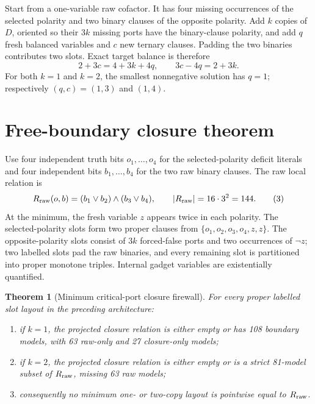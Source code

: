\documentclass[11pt]{article}
\newtheorem{theorem}{Theorem}
\begin{document}
Start from a one-variable raw cofactor.  It has four missing occurrences of
the selected polarity and two binary clauses of the opposite polarity.  Add
$k$ copies of $D$, oriented so their $3k$ missing ports have the binary-clause
polarity, and add $q$ fresh balanced variables and $c$ new ternary clauses.
Padding the two binaries contributes two slots.  Exact target balance is
therefore
\[
 2+3c=4+3k+4q,
 \qquad \boxed{3c-4q=2+3k}.                         \tag{2}
\]
For both $k=1$ and $k=2$, the smallest nonnegative solution has $q=1$;
respectively $(q,c)=(1,3)$ and $(1,4)$.

\section{Free-boundary closure theorem}

Use four independent truth bits $o_1,\ldots,o_4$ for the selected-polarity
deficit literals and four independent bits $b_1,\ldots,b_4$ for the two raw
binary clauses.  The raw local relation is
\[
 R_{\rm raw}(o,b)=(b_1\lor b_2)\land(b_3\lor b_4),
\qquad |R_{\rm raw}|=16\cdot 3^2=144.              \tag{3}
\]
At the minimum, the fresh variable $z$ appears twice in each polarity.  The
selected-polarity slots form two proper clauses from
$\{o_1,o_2,o_3,o_4,z,z\}$.  The opposite-polarity slots consist of $3k$
forced-false ports and two occurrences of $\neg z$; two labelled slots pad the
raw binaries, and every remaining slot is partitioned into proper monotone
triples.  Internal gadget variables are existentially quantified.

\begin{theorem}[Minimum critical-port closure firewall]
For every proper labelled slot layout in the preceding architecture:
\begin{enumerate}
\item if $k=1$, the projected closure relation is either empty or has 108
boundary models, with 63 raw-only and 27 closure-only models;
\item if $k=2$, the projected closure relation is either empty or is a strict
81-model subset of $R_{\rm raw}$, missing 63 raw models;
\item consequently no minimum one- or two-copy layout is pointwise equal to
$R_{\rm raw}$.
\end{enumerate}
\end{theorem}
\end{document}
